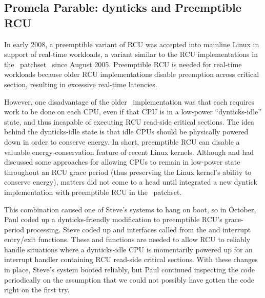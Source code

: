 

\subsection{Promela Parable: dynticks and Preemptible RCU}
\label{sec:formal:Promela Parable: dynticks and Preemptible RCU}

In early 2008, a preemptible variant of RCU was accepted into
mainline Linux in support of real-time workloads,
a variant similar to the RCU implementations in
the \rt\ patchset~\cite{IngoMolnar05a}
since August 2005.
Preemptible RCU is needed for real-time workloads because older
RCU implementations disable preemption across 
{critical section}, resulting in excessive real-time latencies.

However, one disadvantage of the older \rt\ implementation
was that each 
requires work to be done on each CPU, even if that CPU is in a low-power
``dynticks-idle'' state,
and thus incapable of executing RCU read-side critical sections.
The idea behind the dynticks-idle state is that idle CPUs
should be physically powered down in order to conserve energy.
In short, preemptible RCU can disable a valuable energy-conservation
feature of recent Linux kernels.
Although  and 
had discussed some approaches for allowing
CPUs to remain in low-power state throughout an RCU grace period
(thus preserving the Linux kernel's ability to conserve energy), matters
did not come to a head until  integrated a new dyntick
implementation with preemptible RCU in the \rt\ patchset.

This combination caused one of Steve's systems to hang on boot, so in
October, Paul coded up a dynticks-friendly modification to preemptible RCU's
grace-period processing.
Steve coded up  and 
interfaces called from the
 and  interrupt
entry/exit functions.
These  and 
functions are needed to allow RCU to reliably handle situations where
a dynticks-idle CPU is momentarily powered up for an interrupt
handler containing RCU read-side critical sections.
With these changes in place, Steve's system booted reliably,
but Paul continued inspecting the code periodically on the assumption
that we could not possibly have gotten the code right on the first try.

